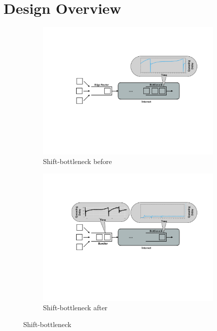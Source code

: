 \section{Design Overview}\label{s:design}
\begin{figure}
    \centering
    \begin{subfigure}[b]{0.45\textwidth}
        \includegraphics[width=\textwidth]{img/shift-bottleneck-before}
        \caption{Shift-bottleneck before}\label{fig:design:shift-bottleneck:before}
    \end{subfigure}
    \begin{subfigure}[b]{0.45\textwidth}
        \includegraphics[width=\textwidth]{img/shift-bottleneck-after}
        \caption{Shift-bottleneck after}\label{fig:design:shift-bottleneck:after}
    \end{subfigure}
    \caption{Shift-bottleneck}\label{fig:design:shift-bottleneck}
\end{figure}

